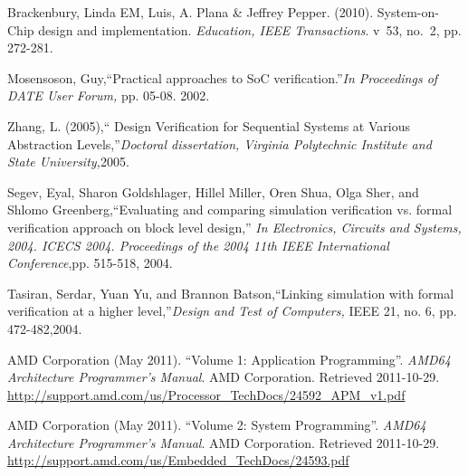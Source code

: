 \begin{thebibliography}{10}

Brackenbury, Linda EM, Luis, A. Plana \& Jeffrey Pepper. (2010). System-on-Chip design and implementation. {\it Education, IEEE Transactions}. v~53, no.~2, pp. 272-281.

Mosensoson, Guy,``Practical approaches to SoC verification.''\emph{In Proceedings of DATE User Forum,} pp. 05-08. 2002.

Zhang, L. (2005),`` Design Verification for Sequential Systems at Various Abstraction Levels,''\emph{Doctoral dissertation, Virginia Polytechnic Institute and State University,}2005.

Segev, Eyal, Sharon Goldshlager, Hillel Miller, Oren Shua, Olga Sher, and Shlomo Greenberg,``Evaluating and comparing simulation verification vs. formal verification approach on block level design,'' \emph{In Electronics, Circuits and Systems, 2004. ICECS 2004. Proceedings of the 2004 11th IEEE International Conference},pp. 515-518, 2004.

Tasiran, Serdar, Yuan Yu, and Brannon Batson,``Linking simulation with formal verification at a higher level,''\emph{Design and Test of Computers,} IEEE 21, no. 6, pp. 472-482,2004.

\BIBentryALTinterwordspacing
AMD Corporation (May 2011). ``Volume 1: Application Programming''. \emph{AMD64 Architecture Programmer's Manual}. AMD Corporation. Retrieved 2011-10-29.
\url{http://support.amd.com/us/Processor_TechDocs/24592_APM_v1.pdf}
\BIBentrySTDinterwordspacing
 
\BIBentryALTinterwordspacing
AMD Corporation (May 2011). ``Volume 2: System Programming''. \emph{AMD64 Architecture Programmer's Manual}. AMD Corporation. Retrieved 2011-10-29.
\url{http://support.amd.com/us/Embedded_TechDocs/24593.pdf}
\BIBentrySTDinterwordspacing
 

\end{thebibliography}
